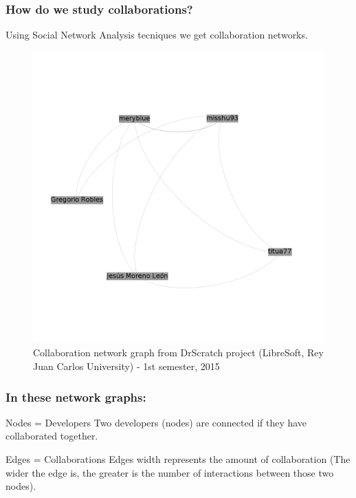 \documentclass{beamer}
\begin{document}
\begin{frame}
\frametitle{How do we study collaborations?}
Using Social Network Analysis tecniques we get collaboration networks.
\begin{figure}
\includegraphics[scale=0.16]{example-graph1.png}
\caption{Collaboration network graph from DrScratch project 
(LibreSoft, Rey Juan Carlos University) - 1st semester, 2015}
\end{figure}
\end{frame}


\begin{frame}
\frametitle{In these network graphs:}
\begin{block}{Nodes = Developers}
Two developers (nodes) are connected if they have collaborated together.
\end{block}

\begin{block}{Edges = Collaborations}
Edges width represents the amount of collaboration
(The wider the edge is, the greater is the number of interactions between those two nodes).
\end{block}

\end{frame}

\end{document}
